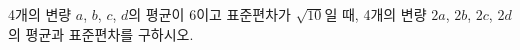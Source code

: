 4개의 변량 $a$, $b$, $c$, $d$의 평균이 6이고 표준편차가 $\sqrt{10}$일 때, 4개의 변량 $2a$, $2b$, $2c$, $2d$의 평균과 표준편차를 구하시오.
